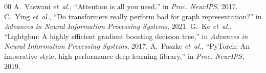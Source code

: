 \documentclass[conference]{IEEEtran}
\begin{document}
\begin{thebibliography}{00}
 A.~Vaswani \emph{et~al.}, ``Attention is all you need,'' in \emph{Proc. NeurIPS}, 2017.
 C.~Ying \emph{et~al.}, ``Do transformers really perform bad for graph representation?'' in \emph{Advances in Neural Information Processing Systems}, 2021.
 G.~Ke \emph{et~al.}, ``Lightgbm: A highly efficient gradient boosting decision tree,'' in \emph{Advances in Neural Information Processing Systems}, 2017.
 A.~Paszke \emph{et~al.}, ``PyTorch: An imperative style, high-performance deep learning library,'' in \emph{Proc. NeurIPS}, 2019.
\end{thebibliography}
\end{document}
